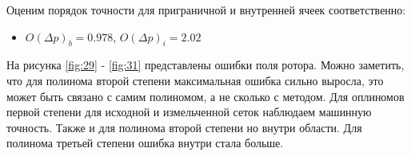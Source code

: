 \begin{table}[H]
    \centering
    \caption{Ошибка вычислений ротора для различных сеток и полиномов}

    \label{tab:6}
\end{table}
Оценим порядок точности для приграничной и внутренней ячеек соответственно:

\begin{itemize}
    \item $O(\Delta p)_b = 0.978$, $O(\Delta p)_i = 2.02$
\end{itemize}

На рисунка \ref{fig:29} - \ref{fig:31} представлены ошибки поля ротора. Можно заметить, что для полинома второй степени максимальная ошибка сильно выросла, это может быть связано с самим полиномом, а не сколько с методом. Для оплиномов первой степени для исходной и измельченной сеток наблюдаем машинную точность. Также и для полинома второй степени но внутри области. Для полинома третьей степени ошибка внутри стала больше.

